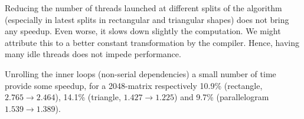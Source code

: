 \item Reducing the number of threads launched at different splits of the algorithm (especially in latest splits in rectangular and triangular shapes) does not bring any speedup. Even worse, it slows down slightly the computation. We might attribute this to a better constant transformation by the compiler. Hence, having many idle threads does not impede performance.

\item Unrolling the inner loops (non-serial dependencies) a small number of time provide some speedup, for a 2048-matrix respectively 10.9\% (rectangle, $2.765\to 2.464$), 14.1\% (triangle, $1.427\to 1.225$) and 9.7\% (parallelogram $1.539\to 1.389$).

\ule

